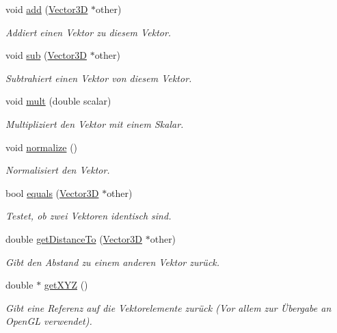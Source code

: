 \begin{DoxyCompactItemize}
void \hyperlink{classVector3D_a0d14ff1f789254ff90adc22628eb8347}{add} (\hyperlink{classVector3D}{Vector3\-D} $\ast$other)
\begin{DoxyCompactList}\small\item\em Addiert einen Vektor zu diesem Vektor. \end{DoxyCompactList}\item 
void \hyperlink{classVector3D_a02364a41693ac080f5adadd776df74b4}{sub} (\hyperlink{classVector3D}{Vector3\-D} $\ast$other)
\begin{DoxyCompactList}\small\item\em Subtrahiert einen Vektor von diesem Vektor. \end{DoxyCompactList}\item 
void \hyperlink{classVector3D_a3dec11494c99de7370e3877054c3ef13}{mult} (double scalar)
\begin{DoxyCompactList}\small\item\em Multipliziert den Vektor mit einem Skalar. \end{DoxyCompactList}\item 
void \hyperlink{classVector3D_abfb12ecb9c9beb88e095cc4a1a512d3c}{normalize} ()
\begin{DoxyCompactList}\small\item\em Normalisiert den Vektor. \end{DoxyCompactList}\item 
bool \hyperlink{classVector3D_ac83e936757114f32bc9d868ea5fabbc2}{equals} (\hyperlink{classVector3D}{Vector3\-D} $\ast$other)
\begin{DoxyCompactList}\small\item\em Testet, ob zwei Vektoren identisch sind. \end{DoxyCompactList}\item 
double \hyperlink{classVector3D_a42deb992ec2f44abfb5824ea4917135c}{get\-Distance\-To} (\hyperlink{classVector3D}{Vector3\-D} $\ast$other)
\begin{DoxyCompactList}\small\item\em Gibt den Abstand zu einem anderen Vektor zurück. \end{DoxyCompactList}\item 
double $\ast$ \hyperlink{classVector3D_a89aeff2092d6a954cd449aca97c59197}{get\-X\-Y\-Z} ()
\begin{DoxyCompactList}\small\item\em Gibt eine Referenz auf die Vektorelemente zurück (Vor allem zur Übergabe an Open\-G\-L verwendet). \end{DoxyCompactList}\item 

\end{DoxyCompactItemize}
